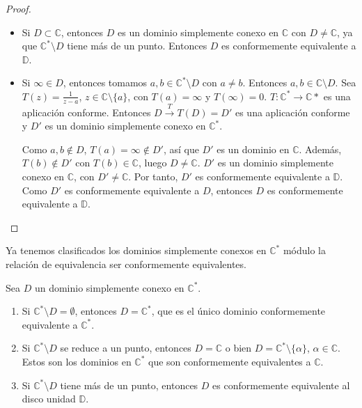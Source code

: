 \begin{proof}
    \hfill
    \begin{itemize}
        \item Si $D \subset \mathbb{C}$, entonces $D$ es un dominio simplemente conexo en $\mathbb{C}$ con $D \neq \mathbb{C}$, ya que $\mathbb{C}^\ast \setminus D$ tiene más de un punto.
              Entonces $D$ es conformemente equivalente a $\mathbb{D}$.
        \item Si $\infty \in D$, entonces tomamos $a, b \in \mathbb{C}^\ast \setminus D$ con $a \neq b$.
              Entonces $a, b \in \mathbb{C} \setminus D$.
              Sea $T(z) = \frac{1}{z-a}$, $z \in \mathbb{C} \setminus \{a\}$, con $T(a) = \infty$ y $T(\infty) = 0$.
              $T: \mathbb{C}^\ast \to \mathbb{C}\ast$ es una aplicación conforme.
              Entonces $D \xrightarrow{T} T(D) = D'$ es una aplicación conforme y $D'$ es un dominio simplemente conexo en $\mathbb{C}^\ast$.

              Como $a, b \notin D$, $T(a) = \infty \notin D'$, así que $D'$ es un dominio en $\mathbb{C}$.
              Además, $T(b) \notin D'$ con $T(b) \in \mathbb{C}$, luego $D \neq \mathbb{C}$.
              $D'$ es un dominio simplemente conexo en $\mathbb{C}$, con $D' \neq \mathbb{C}$.
              Por tanto, $D'$ es conformemente equivalente a $\mathbb{D}$.
              Como $D'$ es conformemente equivalente a $D$, entonces $D$ es conformemente equivalente a $\mathbb{D}$.
    \end{itemize}
\end{proof}

Ya tenemos clasificados los dominios simplemente conexos en $\mathbb{C}^\ast$ módulo la relación de equivalencia ser conformemente equivalentes.

Sea $D$ un dominio simplemente conexo en $\mathbb{C}^\ast$.
\begin{enumerate}
    \item Si $\mathbb{C}^\ast \setminus D = \emptyset$, entonces $D = \mathbb{C}^\ast$, que es el único dominio conformemente equivalente a $\mathbb{C}^\ast$.
    \item Si $\mathbb{C}^\ast \setminus D$ se reduce a un punto, entonces $D = \mathbb{C}$ o bien $D = \mathbb{C}^\ast \setminus \{\alpha\}$, $\alpha \in \mathbb{C}$.
          Estos son los dominios en $\mathbb{C}^\ast$ que son conformemente equivalentes a $\mathbb{C}$.
    \item Si $\mathbb{C}^\ast \setminus D$ tiene más de un punto, entonces $D$ es conformemente equivalente al disco unidad $\mathbb{D}$.
\end{enumerate}

